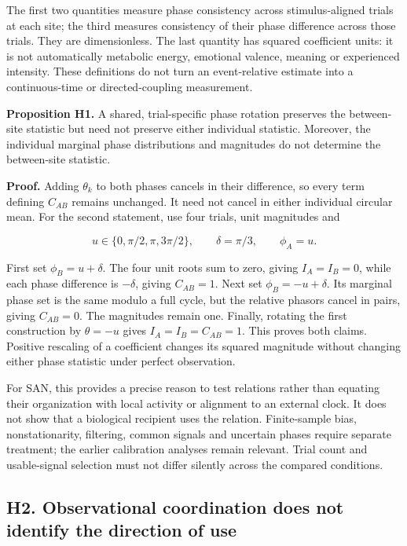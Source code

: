 \documentclass[
  american,
  11pt,
  letterpaper,
]{article}
\begin{document}
The first two quantities measure phase consistency across stimulus-aligned trials at each site; the third measures consistency of their phase difference across those trials. They are dimensionless. The last quantity has squared coefficient units: it is not automatically metabolic energy, emotional valence, meaning or experienced intensity. These definitions do not turn an event-relative estimate into a continuous-time or directed-coupling measurement.

\textbf{Proposition H1.} A shared, trial-specific phase rotation preserves the between-site statistic but need not preserve either individual statistic. Moreover, the individual marginal phase distributions and magnitudes do not determine the between-site statistic.

\textbf{Proof.} Adding \(\theta_k\) to both phases cancels in their difference, so every term defining \(C_{AB}\) remains unchanged. It need not cancel in either individual circular mean. For the second statement, use four trials, unit magnitudes and

\begin{equation}
u\in\{0,\pi/2,\pi,3\pi/2\},\qquad
\delta=\pi/3,\qquad \phi_A=u.
\tag{H2}
\end{equation}

First set \(\phi_B=u+\delta\). The four unit roots sum to zero, giving \(I_A=I_B=0\), while each phase difference is \(-\delta\), giving \(C_{AB}=1\). Next set \(\phi_B=-u+\delta\). Its marginal phase set is the same modulo a full cycle, but the relative phasors cancel in pairs, giving \(C_{AB}=0\). The magnitudes remain one. Finally, rotating the first construction by \(\theta=-u\) gives \(I_A=I_B=C_{AB}=1\). This proves both claims. Positive rescaling of a coefficient changes its squared magnitude without changing either phase statistic under perfect observation.

For SAN, this provides a precise reason to test relations rather than equating their organization with local activity or alignment to an external clock. It does not show that a biological recipient uses the relation. Finite-sample bias, nonstationarity, filtering, common signals and uncertain phases require separate treatment; the earlier calibration analyses remain relevant. Trial count and usable-signal selection must not differ silently across the compared conditions.

\subsection{H2. Observational coordination does not identify the direction of use}\label{h2.-observational-coordination-does-not-identify-the-direction-of-use}
\end{document}
